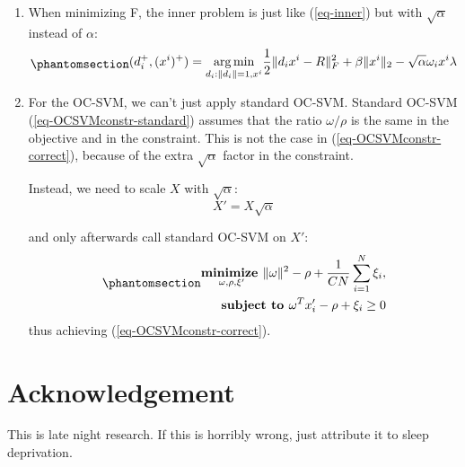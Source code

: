 \documentclass[
  letterpaper,
  DIV=11,
  numbers=noendperiod]{scrartcl}
\begin{document}
\begin{enumerate}
\def\labelenumi{\arabic{enumi}.}
\item
  When minimizing F, the inner problem is just like (\ref{eq-inner}) but
  with \(\sqrt{\alpha}\) instead of \(\alpha\):
  \begin{equation}\phantomsection\label{eq-inner2}{
    \begin{align}
    (d^+_i,(x^i)^+) = \underset{d_i: \|d_i\|=1,x^i}{\arg\min} \frac12\|d_ix^i - R\|_F^2  + \beta\|x^i\|_2 - \sqrt{\alpha} \omega_i x^i\lambda
    \end{align}
    }\end{equation}
\item
  For the OC-SVM, we can't just apply standard OC-SVM. Standard OC-SVM
  (\ref{eq-OCSVMconstr-standard}) assumes that the ratio
  \(\omega / \rho\) is the same in the objective and in the constraint.
  This is not the case in (\ref{eq-OCSVMconstr-correct}), because of the
  extra \(\sqrt{\alpha}\) factor in the constraint.

  Instead, we need to scale \(X\) with \(\sqrt{\alpha}\):
  \[X' = X \sqrt{\alpha}\]

  and only afterwards call standard OC-SVM on \(X'\):
  \begin{equation}\phantomsection\label{eq-OCSVMconstr-scaled}{
    \begin{align}
    \underset{\omega, \rho, \xi'}{\textbf{minimize  }} \|\omega\|^2 - \rho + \frac{1}{CN} \sum_{i=1}^{N} \xi_i, \\
    \textbf{subject to  } \omega^T x_i' - \rho + \xi_i \geq 0\\
    \end{align}
    }\end{equation} thus achieving (\ref{eq-OCSVMconstr-correct}).
\end{enumerate}

\section{Acknowledgement}\label{acknowledgement}

This is late night research. If this is horribly wrong, just attribute
it to sleep deprivation.
\end{document}
